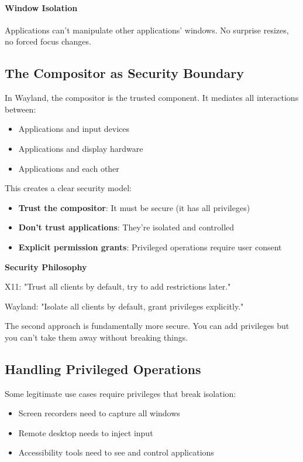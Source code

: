 \paragraph{Window Isolation}
Applications can't manipulate other applications' windows. No surprise resizes, no forced focus changes.

\subsection{The Compositor as Security Boundary}

In Wayland, the compositor is the trusted component. It mediates all interactions between:
\begin{itemize}
    \item Applications and input devices
    \item Applications and display hardware
    \item Applications and each other
\end{itemize}

This creates a clear security model:
\begin{itemize}
    \item \textbf{Trust the compositor}: It must be secure (it has all privileges)
    \item \textbf{Don't trust applications}: They're isolated and controlled
    \item \textbf{Explicit permission grants}: Privileged operations require user consent
\end{itemize}

\begin{designbox}
\textbf{Security Philosophy}

X11: "Trust all clients by default, try to add restrictions later."

Wayland: "Isolate all clients by default, grant privileges explicitly."

The second approach is fundamentally more secure. You can add privileges but you can't take them away without breaking things.
\end{designbox}

\subsection{Handling Privileged Operations}

Some legitimate use cases require privileges that break isolation:
\begin{itemize}
    \item Screen recorders need to capture all windows
    \item Remote desktop needs to inject input
    \item Accessibility tools need to see and control applications
\end{itemize}

